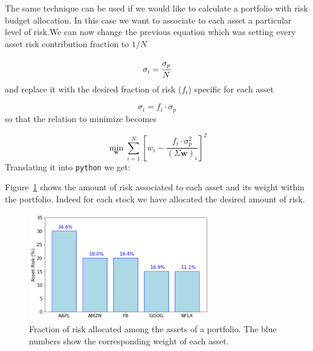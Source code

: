 The same technique can be used if we would like to calculate a portfolio with risk budget allocation. In this case we want to associate to each asset a particular level of risk.We can now change the previous equation which was setting every asset risk contribution fraction to $1/N$

\begin{equation} 
\sigma _{i}=\cfrac{\sigma_p}{N} 
\end{equation}
and replace it with the desired fraction of risk (\(f_i\)) specific for each asset

\begin{equation} 
\sigma _{i}=f_i \cdot \sigma_p 
\end{equation}
so that the relation to minimize becomes

\begin{equation} 
\underset{\mathbf{w}}{\min} \sum _{i=1}^{N}\left[w_{i}-{\frac {f_i \cdot \sigma_p^{2}}{(\Sigma \mathbf{w})_{i}}}\right]^{2} 
\end{equation}
\noindent
Translating it into \texttt{python} we get:


Figure~\ref{fig:risk_allocation} shows the amount of risk associated to each asset and its weight within the portfolio. 
Indeed for each stock we have allocated the desired amount of risk.

\begin{figure}[htb]
\centering
\includegraphics[width=0.7\textwidth]{figures/risk_allocation}
\caption{Fraction of risk allocated among the assets of a portfolio. The blue numbers show the corresponding weight of each asset.}
\label{fig:risk_allocation}
\end{figure}


